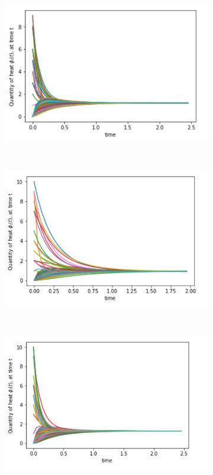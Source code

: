 \documentclass[10pt,a4paper]{article}
\theoremstyle{plain}
\theoremstyle{definition}
\begin{document}
     \begin{figure}[H]
     	\centering
     	\begin{subfigure}[b]{0.45\textwidth}
     		\includegraphics[width= \textwidth]{images/BA-degreesource.png}
     		\caption{}
     		\label{}
     	\end{subfigure}~
     	\begin{subfigure}[b]{0.45\textwidth}
     		\includegraphics[width= \textwidth]{images/BA-randomsource.png}
     		\caption{}
     		\label{}
     	\end{subfigure}\\
     	\begin{subfigure}[b]{0.45\textwidth}
     		\includegraphics[width= \textwidth]{images/ER-degreesource.png}

\end{subfigure}
\end{figure}
\end{document}
